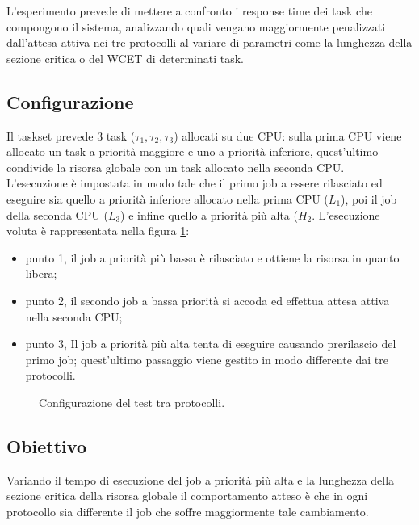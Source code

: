 L'esperimento prevede di mettere a confronto i response time dei task che compongono il sistema, analizzando quali vengano maggiormente penalizzati dall'attesa attiva nei tre protocolli al variare di parametri come la lunghezza della sezione critica o del WCET di determinati task.\\

\subsection{Configurazione}
\label{sec:confronto_protocolli_conf}

Il taskset prevede 3 task ($\tau_1, \tau_2, \tau_3$) allocati su due CPU: sulla prima CPU viene allocato un task a priorità maggiore e uno a priorità inferiore, quest'ultimo condivide la risorsa globale con un task allocato nella seconda CPU.\\

L'esecuzione è impostata in modo tale che il primo job a essere rilasciato ed eseguire sia quello a priorità inferiore allocato nella prima CPU ($L_1$), poi il job della seconda CPU ($L_3$) e infine quello a priorità più alta ($H_2$. L'esecuzione voluta è rappresentata nella figura \ref{fig:test_protocols}: 

\begin{itemize}
  \item punto {\color{red} 1}, il job a priorità più bassa è rilasciato e ottiene la risorsa in quanto libera;
  \item punto {\color{red} 2}, il secondo job a bassa priorità si accoda ed effettua attesa attiva nella seconda CPU;
  \item punto {\color{red} 3}, Il job a priorità più alta tenta di eseguire causando prerilascio del primo job; quest'ultimo passaggio viene gestito in modo differente dai tre protocolli.\\
\end{itemize}

\begin{figure}
\centering
{}
\caption{Configurazione del test tra protocolli.}
\label{fig:test_protocols}
\end{figure}

\subsection{Obiettivo}
\label{sec:confronto_protocolli_ob}

Variando il tempo di esecuzione del job a priorità più alta e la lunghezza della sezione critica della risorsa globale il comportamento atteso è che in ogni protocollo sia differente il job che soffre maggiormente tale cambiamento.\\

